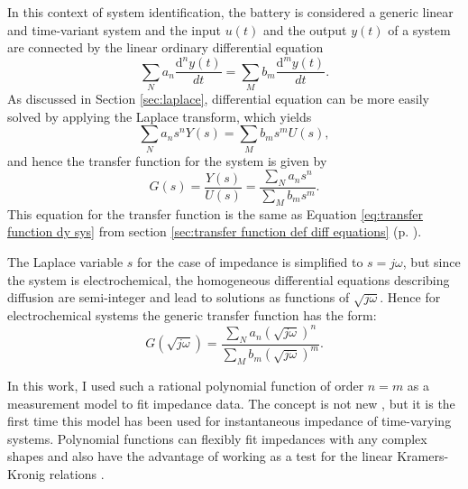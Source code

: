 In this context of system identification, the battery is considered a generic linear and time-variant system and the input $u(t)$ and the output $y(t)$ of a system are connected by the linear ordinary differential equation
\begin{equation}
    \sum_{N} a_n \frac{\text{d}^ny(t)}{dt} = \sum_{M} b_m \frac{\text{d}^my(t)}{dt}.
\end{equation}
As discussed in Section \ref{sec:laplace}, differential equation can be more easily solved by applying the Laplace transform, which yields
\begin{equation}
    \sum_{N} a_n s^n Y(s) = \sum_{M} b_m s^m U(s),
\end{equation}
and hence the transfer function for the system is given by
\begin{equation}
    G(s) = \frac{Y(s)}{U(s)}=\frac{\sum_{N} a_n s^n}{\sum_{M} b_m s^m}.
\end{equation}
This equation for the transfer function is the same as Equation \ref{eq:transfer function dy sys} from section \ref{sec:transfer function def diff equations} (p. \pageref{sec:transfer function def diff equations}).

The Laplace variable $s$ for the case of impedance is simplified to $s = j\omega$, but since the system is electrochemical, the homogeneous differential equations describing diffusion are semi-integer \cite{oldhamFractionalDifferentialEquations2010} and lead to solutions as functions of $\sqrt{j\omega}$.
Hence for electrochemical systems the generic transfer function has the form:
\begin{equation}
    G(\sqrt{j\omega}) = \frac{\sum_{N} a_n (\sqrt{j\omega})^n}{\sum_{M} b_m (\sqrt{j\omega})^m}.
    \label{eq:general rational polynomial}
\end{equation}

In this work, I used such a rational polynomial function of order $n=m$ as a measurement model to fit impedance data.
The concept is not new \cite{zoltowskiNontraditionalApproachMeasurement2005,gheemTheoreticalApproachModelling2008a,liModelReductionFractional2024}, but it is the first time this model has been used for instantaneous impedance of time-varying systems.
Polynomial functions can flexibly fit impedances with any complex shapes and also have the advantage of working as a test for the linear Kramers-Kronig relations \cite{sadkowskiCNLSFitsKramers2004}.

